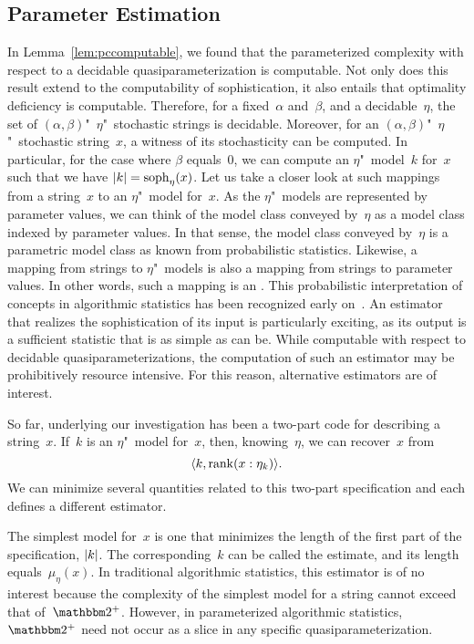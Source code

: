 \subsection{Parameter Estimation}
\label{sec:statistics:estimation}%
In Lemma~\ref{lem:pccomputable}, we found that the parameterized complexity with respect to a decidable quasiparameterization is computable.
Not only does this result extend to the computability of sophistication, it also entails that optimality deficiency is computable.
Therefore, for a fixed~$\alpha$ and~$\beta$, and a decidable~$\eta$, the set of $(\alpha, \beta)$"~$\eta$"~stochastic strings is decidable.
Moreover, for an $(\alpha, \beta)$"~$\eta$"~stochastic string~$x$, a witness of its stochasticity can be computed.
In particular, for the case where $\beta$ equals~$0$, we can compute an $\eta$"~model~$k$ for~$x$ such that we have ${\lvert k\rvert} = \operatorname{soph}_\eta(x)$.
Let us take a closer look at such mappings from a string~$x$ to an $\eta$"~model for~$x$.
As the $\eta$"~models are represented by parameter values, we can think of the model class conveyed by~$\eta$ as a model class indexed by parameter values.
In that sense, the model class conveyed by~$\eta$ is a parametric model class as known from probabilistic statistics.
Likewise, a mapping from strings to $\eta$"~models is also a mapping from strings to parameter values.
In other words, such a mapping is an .
This probabilistic interpretation of concepts in algorithmic statistics has been recognized early on~\parencite{rissanen1983universal,vitanyi2000minimum,gacs2001algorithmic}.
An estimator that realizes the sophistication of its input is particularly exciting, as its output is a sufficient statistic that is as simple as can be.
While computable with respect to decidable quasiparameterizations, the computation of such an estimator may be prohibitively resource intensive.
For this reason, alternative estimators are of interest.

So far, underlying our investigation has been a two-part code for describing a string~$x$.
If~$k$ is an $\eta$"~model for~$x$, then, knowing~$\eta$, we can recover~$x$ from
\begin{equation}
\label{eq:two-part}
  {\langle k, \operatorname{rank}(x : \eta_k)\rangle}.
\end{equation}
We can minimize several quantities related to this two-part specification and each defines a different estimator.

The simplest model for~$x$ is one that minimizes the length of the first part of the specification, ${\lvert k\rvert}$.
The corresponding~$k$ can be called the  estimate, and its length equals~$\mu_\eta(x)$.
In traditional algorithmic statistics, this estimator is of no interest because the complexity of the simplest model for a string cannot exceed that of~$\binary^+$.
However, in parameterized algorithmic statistics, $\binary^+$ need not occur as a slice in any specific quasiparameterization.

